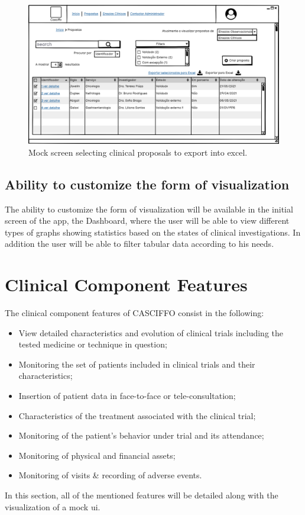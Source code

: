 \begin{figure}[H]
    \centering
    \includegraphics[scale=0.35]{Chapters/img/propostas/propostas-exportar-para-excel.png}
    \caption{Mock screen selecting clinical proposals to export into excel.}
    \label{fig:proposta-export-excel}
\end{figure}

\subsection{Ability to customize the form of visualization}
\label{subsec:ability-to-customize-visualization}
The ability to customize the form of visualization will be available in the initial screen of the app, the Dashboard, where the user will be able to view different types of graphs showing statistics based on the states of clinical investigations. In addition the user will be able to filter tabular data according to his needs.


\section{Clinical Component Features}
The clinical component features of CASCIFFO consist in the following:
\begin{itemize}
    \item View detailed characteristics and evolution of clinical trials including the tested medicine or technique in question;
    \item Monitoring the set of patients included in clinical trials and their characteristics;
    \item Insertion of patient data in face-to-face or tele-consultation;
    \item Characteristics of the treatment associated with the clinical trial;
    \item Monitoring of the patient’s behavior under trial and its attendance;
    \item Monitoring of physical and financial assets;
    \item Monitoring of visits \& recording of adverse events.
\end{itemize}
In this section, all of the mentioned features will be detailed along with the visualization of a mock \acrshort{ui}.

